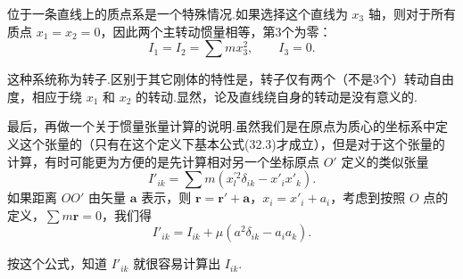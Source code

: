 位于一条直线上的质点系是一个特殊情况.如果选择这个直线为 $x_3$ 轴，则对于所有质点 $x_1=x_2=0$，因此两个主转动惯量相等，第3个为零：
\begin{equation}
  I_1=I_2=\sum m x_3^2,\qquad I_3=0.
\end{equation}

这种系统称为转子.区别于其它刚体的特性是，转子仅有两个（不是3个）转动自由度，相应于绕 $x_1$ 和 $x_2$ 的转动.显然，论及直线绕自身的转动是没有意义的.

最后，再做一个关于惯量张量计算的说明.虽然我们是在原点为质心的坐标系中定义这个张量的（只有在这个定义下基本公式(32.3)才成立），但是对于这个张量的计算，有时可能更为方便的是先计算相对另一个坐标原点 $O'$ 定义的类似张量
\begin{equation*}
  I'_{ik}=\sum m\left(x_l^{\prime2}\delta_{ik}-x'_i x'_k\right).
\end{equation*}
如果距离 $OO'$ 由矢量 $\boldsymbol{a}$ 表示，则 $\boldsymbol{r}=\boldsymbol{r}'+\boldsymbol{a}$，$x_i=x'_i+a_i$，考虑到按照 $O$ 点的定义，$\sum m\boldsymbol{r}=0$，我们得
\begin{equation}
  I'_{ik}=I_{ik}+\mu\left(a^2\delta_{ik}-a_i a_k\right).
\end{equation}

按这个公式，知道 $I'_{ik}$ 就很容易计算出 $I_{ik}$.

